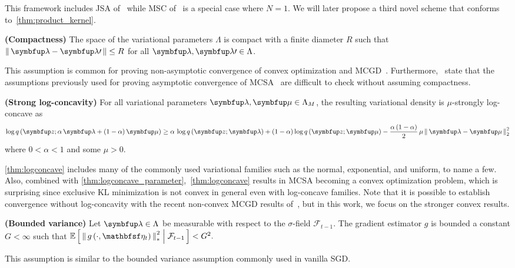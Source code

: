 This framework includes JSA of~\citet{pmlr-v124-ou20a} while MSC of~\citet{pmlr-v124-ou20a} is a special case where \(N=1\).
We will later propose a third novel scheme that conforms to~\cref{thm:product_kernel}.

\begin{assumption}{\textbf{(Compactness)}}\label{thm:compact}
  The space of the variational parameters \(\Lambda\) is compact with a finite diameter \(R\) such that \(\norm{\vlambda - \vlambda\prime} \leq R \) for all \(\vlambda, \vlambda\prime \in \Lambda\).
\end{assumption}
This assumption is common for proving non-asymptotic convergence of convex optimization and MCGD~\citep{duchi_ergodic_2012, NEURIPS2018_1371bcce, doan_convergence_2020}.
Furthermore,~\citeauthor{NEURIPS2020_b2070693} state that the assumptions previously used for proving asymptotic convergence of MCSA~\citep{NEURIPS2020_b2070693} are difficult to check without assuming compactness.

\begin{assumption}{\textbf{(Strong log-concavity)}}\label{thm:logconcave}
  For all variational parameters \(\vlambda, \vmu \in \Lambda_{M}\), the resulting variational density is \(\mu\)-strongly log-concave as
  \[
  \log q\left(\vz; \alpha \, \vlambda + (1 - \alpha) \, \vmu\right)
  \geq 
  \alpha \, \log q\left(\vz; \vlambda\right)
  + (1 - \alpha) \log q\left(\vz; \vmu\right) - \frac{\alpha \, (1 - \alpha)}{2}\, \mu\,\norm{\vlambda - \vmu}^2_2
  \]
  where \(0 < \alpha < 1\) and some \(\mu > 0\).
\end{assumption}
%

%
\cref{thm:logconcave} includes many of the commonly used variational families such as the normal, exponential, and uniform, to name a few.
Also, combined with \cref{thm:logconcave_parameter},~\cref{thm:logconcave} results in MCSA becoming a convex optimization problem, which is surprising since exclusive KL minimization is not convex in general even with log-concave families.
Note that it is possible to establish convergence without log-concavity with the recent non-convex MCGD results of~\citet{NEURIPS2018_1371bcce, pmlr-v99-karimi19a, doan_convergence_2020}, but in this work, we focus on the stronger convex results.

\begin{assumption}{\textbf{(Bounded variance)}}\label{thm:bounded_variance}
  Let \(\vlambda \in \Lambda\) be measurable with respect to the \(\sigma\)-field \(\mathcal{F}_{t-1}\).
  The  gradient estimator \(g\) is bounded a constant \(G < \infty\) such that
  \(
  \E{ {\lVert\, g\left(\cdot, \rvveta_{t}\right) \,\rVert}^2_{*} \;\middle|\; \mathcal{F}_{t-1}} < G^2.
  \)
\end{assumption}
This assumption is similar to the bounded variance assumption commonly used in vanilla SGD.

